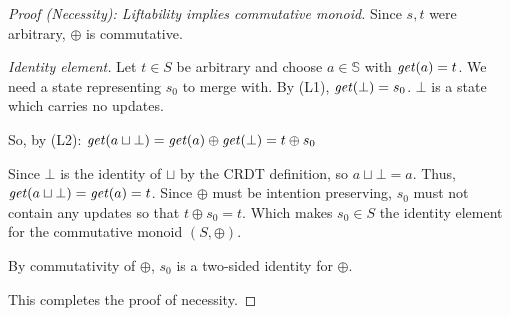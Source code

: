 \begin{proof}[Proof (Necessity): Liftability implies commutative monoid]
Since $s, t$ were arbitrary, $\oplus$ is commutative. 


\medskip
\noindent\emph{Identity element.}
Let $t \in S$ be arbitrary and choose $a \in \mathbb{S}$ with $\mathit{get}(a) = t$. 
We need a state representing $s_0$ to merge with. By (L1), $\mathit{get}(\bot) = s_0$. 
$\bot$ is a state which carries no updates.

So, by (L2): $\mathit{get}(a \sqcup \bot) = \mathit{get}(a) \oplus \mathit{get}(\bot) = t \oplus s_0$

Since $\bot$ is the identity of $\sqcup$ by the CRDT definition, so $a \sqcup \bot = a$. Thus, $\mathit{get}(a \sqcup \bot) = \mathit{get}(a) = t$. 
Since $\oplus$ must be intention preserving, $s_0$ must not contain any updates so that $t \oplus s_0 = t$. 
Which makes $s_0 \in S$ the identity element for the commutative monoid $(S, \oplus)$. 

By commutativity of $\oplus$, $s_0$ is a two-sided identity for $\oplus$.

This completes the proof of necessity.
\end{proof}

